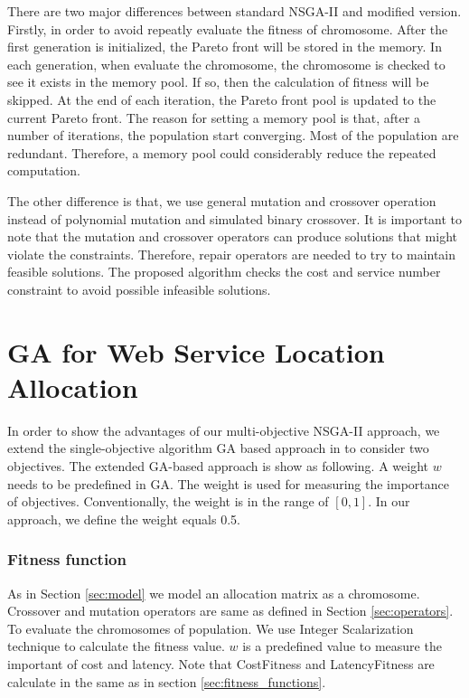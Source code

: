 \documentclass{llncs}
\begin{document}
There are two major differences between standard NSGA-II and modified version. Firstly, in order to avoid repeatly evaluate the fitness
of chromosome. After the first generation is initialized, the Pareto front will be 
stored in the memory. In each generation, when evaluate the chromosome, the chromosome is checked to see it exists in the memory pool. 
If so, then the calculation of fitness will be skipped. At the end of each iteration, the Pareto front pool is updated to the current Pareto front.
The reason for setting a memory pool is that, after a number of iterations, the population start converging. 
Most of the population are redundant. Therefore, a memory pool could considerably reduce the repeated computation.

The other difference is that, we use general mutation and crossover operation instead of polynomial mutation and simulated binary crossover.
It is important to note that the mutation and crossover operators can produce solutions that might violate the constraints. 
Therefore, repair operators are needed to try to maintain feasible solutions. The proposed algorithm checks the cost and service number constraint to avoid
possible infeasible solutions.

\section{GA for Web Service Location Allocation}
In order to show the advantages of our multi-objective NSGA-II approach, we extend the single-objective algorithm GA based approach in \cite{Huang} to consider two objectives. 
The extended GA-based approach is show as following. A weight $w$ needs to be predefined in GA. The weight is used for 
measuring the importance of objectives. Conventionally, the weight is in the range of $[0, 1]$. In our approach, we define the weight equals 0.5.

\subsubsection{Fitness function}
As in Section \ref{sec:model} we model an allocation matrix as a chromosome. Crossover and mutation operators are same as defined in Section \ref{sec:operators}.
To evaluate the chromosomes of population.
We use Integer Scalarization technique to calculate the fitness value. $w$ is a predefined value to measure the important of cost and latency. Note that CostFitness and LatencyFitness
are calculate in the same as in section \ref{sec:fitness_functions}.
\end{document}
